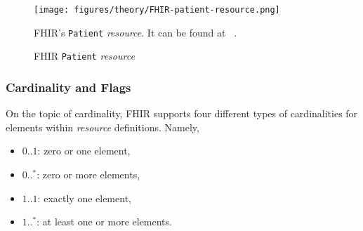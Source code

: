 \begin{figure}[H]
    \centering
    \texttt{[image: figures/theory/FHIR-patient-resource.png]}
    \caption{FHIR \texttt{Patient} \emph{resource}}
    \medskip
    \small
    \raggedright
    FHIR's \texttt{Patient} \emph{resource}. It can be found at ~\cite{FHIR-patient-resource}.
    \label{fig:FHIR-patient-resource}
\end{figure}

\subsubsection*{Cardinality and Flags}
On the topic of cardinality, FHIR supports four different types of cardinalities for elements within \emph{resource} definitions. Namely,
\begin{itemize}
    \item $0..1$: zero or one element,
    \item $0..^\ast$: zero or more elements,
    \item $1..1$: exactly one element,
    \item $1..^\ast$: at least one or more elements.
\end{itemize}

